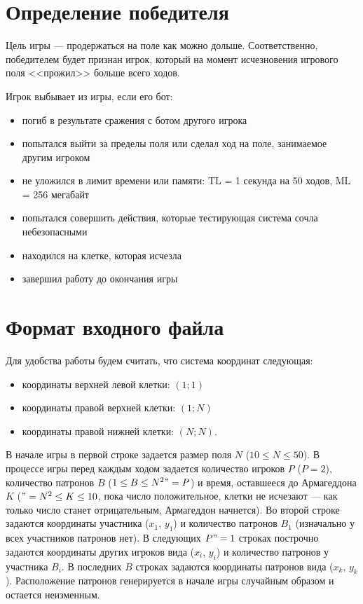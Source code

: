 \documentclass[a4paper,12pt]{article}
\begin{document}
\section*{Определение победителя}
Цель игры --- продержаться на поле как можно дольше. Соответственно, победителем будет признан игрок, который на момент исчезновения игрового поля <<прожил>> больше всего ходов.
\begin{flushleft}
Игрок выбывает из игры, если его бот:
\begin{itemize}
\item погиб в результате сражения с ботом другого игрока
\item попытался выйти за пределы поля или сделал ход на поле, занимаемое другим игроком
\item не уложился в лимит времени или памяти:
TL = 1 секунда на 50 ходов, ML = 256 мегабайт
\item попытался совершить действия, которые тестирующая система сочла небезопасными
\item находился на клетке, которая исчезла
\item завершил работу до окончания игры
\end{itemize}
\end{flushleft}

\section*{Формат входного файла}
Для удобства работы будем считать, что система координат следующая:
\begin{itemize}
\item координаты верхней левой клетки: $(1;1)$
\item координаты правой верхней клетки: $(1;N)$
\item координаты правой нижней клетки: $(N;N)$.
\end{itemize}

\begin{flushleft}
В начале игры в первой строке задается размер поля $N$ ($10 \leq N \leq 50$). В процессе игры перед каждым ходом задается количество игроков $P$ ($P = 2$), количество патронов $B$ ($1 \leq B \leq N^2"=P$) и время, оставшееся до Армагеддона $K$ ($"=N^2 \leq K \leq 10$, пока число положительное, клетки не исчезают --- как только число станет отрицательным, Армагеддон начнется).
Во второй строке задаются координаты участника ($x_1$, $y_1$) и количество патронов $B_1$ (изначально у всех участников патронов нет).
В следующих $P"=1$ строках построчно задаются координаты других игроков вида ($x_i$, $y_i$) и количество патронов у участника $B_i$.
В последних $B$ строках задаются координаты патронов вида ($x_k$, $y_k$). Расположение патронов генерируется в начале игры случайным образом и остается неизменным.
\end{flushleft}
\end{document}
